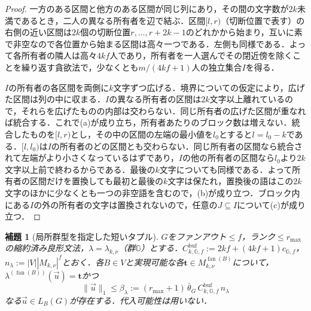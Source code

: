\documentclass[11pt,a4paper]{ltjsarticle}
\numberwithin{equation}{section}
\theoremstyle{plain}
\newtheorem{lemma}[theorem]{補題}
\theoremstyle{definition}
\theoremstyle{remark}
\newcommand{\tuple}[1]{\vec{#1}}
\newcommand{\fan}{\operatorname{fan}}
\begin{document}
\begin{proof}
一方のある区間と他方のある区間が同じ列にあり，その間の文字数が$2k$未満であるとき，二人の異なる所有者を辺で結ぶ．区間$[l,r)$（切断位置で表す）の右側の近い区間は$2k$個の切断位置$r,\ldots,r+2k-1$のどれかから始まり，互いに素で非空なので各位置から始まる区間は高々一つである．左側も同様である．よって各所有者の隣人は高々$4kf$人であり，所有者を一人選んでその閉近傍を除くことを繰り返す貪欲法で，少なくとも$m/(4kf+1)$人の独立集合$I$を得る．

$I$の所有者の各区間を両側に$k$文字ずつ広げる．境界についての仮定により，広げた区間は列の中に収まる．$I$の異なる所有者の区間は$2k$文字以上離れているので，それらを広げたものの内部は交わらない．同じ所有者の広げた区間が重なれば統合する．これで(a)が成り立ち，所有者あたりのブロック数は増えない．統合したものを$[l,r)$とし，その中の区間の左端の最小値を$l_0$とすると$l=l_0-k$である．$[l,l_0)$は$I$の所有者のどの区間とも交わらない．同じ所有者の区間なら統合されて左端がより小さくなっているはずであり，$I$の他の所有者の区間なら$l_0$より$2k$文字以上前で終わるからである．最後の$k$文字についても同様である．よって所有者の区間だけを置換しても最初と最後の$k$文字は保たれ，置換後の語はこの$2k$文字のほかに少なくとも一つの非空語を含むので，(b)が成り立つ．ブロック内にある$I$の外の所有者の文字は置換されないので，任意の$J\subseteq I$について(c)が成り立つ．
\end{proof}

\begin{lemma}[局所群型を指定した短いタプル]
\label{lem:local-group-shortest}
$G$をファンアウト$\le f$，ランク$\le r_{\max}$の縮約済み良形文法，$\lambda=\lambda_{k,\nu}$（群${\mathbb G}$）とする．$C^{\mathrm{buf}}_{k,{\mathbb G},f}:=2kf+(4kf+1)c_{{\mathbb G},f}$，$n_\lambda:=|V||M_{k,\nu}|^f$とおく．各$B\in V$と実現可能な各$\mathbf t\in M_{k,\nu}^{\fan(B)}$について，$\lambda^{(\fan(B))}(\tuple u)=\mathbf t$かつ
\[
 \|\tuple u\|_1\le\beta_\lambda:=(r_{\max}+1)\,\bar\theta_G\,
 C^{\mathrm{buf}}_{k,{\mathbb G},f}\,n_\lambda
\]
なる$\tuple u\in L_B(G)$が存在する．代入可能性は用いない．
\end{lemma}
\end{document}
